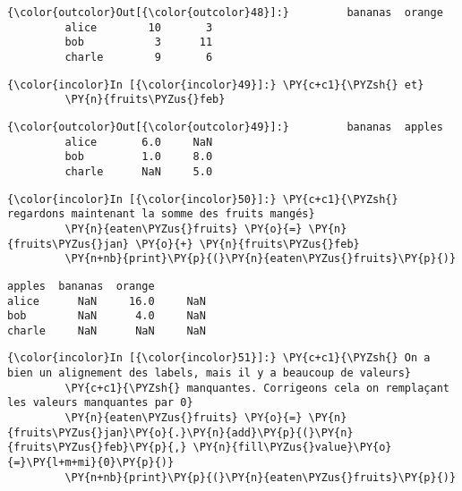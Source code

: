 \begin{Verbatim}[commandchars=\\\{\}]
{\color{outcolor}Out[{\color{outcolor}48}]:}         bananas  orange
         alice        10       3
         bob           3      11
         charle        9       6
\end{Verbatim}
            
    \begin{Verbatim}[commandchars=\\\{\}]
{\color{incolor}In [{\color{incolor}49}]:} \PY{c+c1}{\PYZsh{} et}
         \PY{n}{fruits\PYZus{}feb}
\end{Verbatim}


\begin{Verbatim}[commandchars=\\\{\}]
{\color{outcolor}Out[{\color{outcolor}49}]:}         bananas  apples
         alice       6.0     NaN
         bob         1.0     8.0
         charle      NaN     5.0
\end{Verbatim}
            
    \begin{Verbatim}[commandchars=\\\{\}]
{\color{incolor}In [{\color{incolor}50}]:} \PY{c+c1}{\PYZsh{} regardons maintenant la somme des fruits mangés}
         \PY{n}{eaten\PYZus{}fruits} \PY{o}{=} \PY{n}{fruits\PYZus{}jan} \PY{o}{+} \PY{n}{fruits\PYZus{}feb}
         \PY{n+nb}{print}\PY{p}{(}\PY{n}{eaten\PYZus{}fruits}\PY{p}{)}
\end{Verbatim}


    \begin{Verbatim}[commandchars=\\\{\}]
        apples  bananas  orange
alice      NaN     16.0     NaN
bob        NaN      4.0     NaN
charle     NaN      NaN     NaN

    \end{Verbatim}

    \begin{Verbatim}[commandchars=\\\{\}]
{\color{incolor}In [{\color{incolor}51}]:} \PY{c+c1}{\PYZsh{} On a bien un alignement des labels, mais il y a beaucoup de valeurs}
         \PY{c+c1}{\PYZsh{} manquantes. Corrigeons cela on remplaçant les valeurs manquantes par 0}
         \PY{n}{eaten\PYZus{}fruits} \PY{o}{=} \PY{n}{fruits\PYZus{}jan}\PY{o}{.}\PY{n}{add}\PY{p}{(}\PY{n}{fruits\PYZus{}feb}\PY{p}{,} \PY{n}{fill\PYZus{}value}\PY{o}{=}\PY{l+m+mi}{0}\PY{p}{)}
         \PY{n+nb}{print}\PY{p}{(}\PY{n}{eaten\PYZus{}fruits}\PY{p}{)}
\end{Verbatim}


